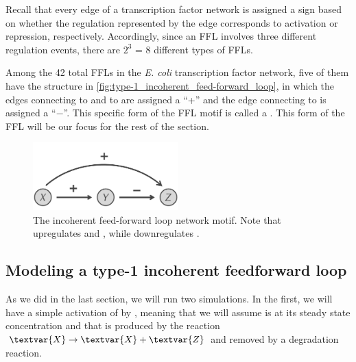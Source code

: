 Recall that every edge of a transcription factor network is assigned a sign based on whether the regulation represented by the edge corresponds to activation or repression, respectively. Accordingly, since an FFL involves three different regulation events, there are $2^3$ = 8 different types of FFLs.

Among the 42 total FFLs in the \textit{E. coli} transcription factor network, five of them have the structure in \autoref{fig:type-1_incoherent_feed-forward_loop}, in which the edges connecting  to  and  to  are assigned a ``+'' and the edge connecting  to  is assigned a ``$-$''. This specific form of the FFL motif is  called a . This form of the FFL will be our focus for the rest of the section.\\

\begin{qbox}\end{qbox}

\begin{figure}[h]
\centering
\mySfFamily
\includegraphics[width = 0.5\textwidth]{../images/type-1_incoherent_feed-forward_loop.png}
\caption{The incoherent feed-forward loop network motif. Note that  upregulates  and , while  downregulates .}
\label{fig:type-1_incoherent_feed-forward_loop}
\end{figure}

\FloatBarrier
{}
\subsection{Modeling a type-1 incoherent feedforward loop}

As we did in the last section, we will run two simulations. In the first, we will have a simple activation of  by , meaning that we will assume  is at its steady state concentration and that  is produced by the reaction $\textvar{X} \rightarrow \textvar{X} + \textvar{Z}$ and removed by a degradation reaction.

